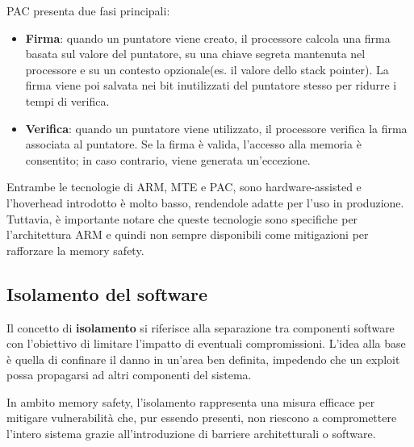 PAC presenta due fasi principali:
\begin{itemize}
  \item \textbf{Firma}: quando un puntatore viene creato, il processore calcola
    una firma basata sul valore del puntatore, su una chiave segreta mantenuta nel
    processore e su un contesto opzionale(es. il valore dello stack pointer). La
    firma viene poi salvata nei bit inutilizzati del puntatore stesso per
    ridurre i tempi di verifica.

  \item \textbf{Verifica}: quando un puntatore viene utilizzato, il processore
    verifica la firma associata al puntatore. Se la firma è valida, l'accesso
    alla memoria è consentito; in caso contrario, viene generata un'eccezione.
\end{itemize}

\bigskip
\noindent
Entrambe le tecnologie di ARM, MTE e PAC, sono hardware-assisted e l'hoverhead introdotto
è molto basso, rendendole adatte per l'uso in produzione. Tuttavia, è importante
notare che queste tecnologie sono specifiche per l'architettura ARM e quindi non
sempre disponibili come mitigazioni per rafforzare la memory safety.

\subsection{Isolamento del software}
\label{sec:isolation}

Il concetto di \textbf{isolamento} si riferisce alla separazione tra componenti
software con l'obiettivo di limitare l'impatto di eventuali compromissioni. L'idea
alla base è quella di confinare il danno in un'area ben definita, impedendo che
un exploit possa propagarsi ad altri componenti del sistema.

In ambito memory safety, l'isolamento rappresenta una misura efficace per mitigare
vulnerabilità che, pur essendo presenti, non riescono a compromettere l'intero sistema
grazie all'introduzione di barriere architetturali o software.


